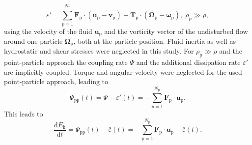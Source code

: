 \documentclass[11pt,a4paper,openany,oneside,parskip=half*]{article}
\renewcommand*\vec[1]{\boldsymbol{#1}}
\begin{document}
\begin{equation}
	\varepsilon' = \sum_{p=1}^{N_\mathrm{p}} \vec{F}_\mathrm{p} \cdot (\vec{u}_\mathrm{p}-\vec{v}_\mathrm{p})+ \vec{T}_\mathrm{p} \cdot (\vec{\Omega}_\mathrm{p} - \vec{\omega}_\mathrm{p}), \; \rho_\mathrm{p} \gg \rho,
\end{equation}
using the velocity of the fluid $\vec{u}_\mathrm{p}$ and the vorticity vector of the undisturbed flow around one particle $\vec{\Omega}_\mathrm{p}$, both at the particle position. Fluid inertia as well as hydrostatic and shear stresses were neglected in this study.
\newline
For $\rho_\mathrm{p} \gg \rho$ and the point-particle approach the coupling rate $\Psi$ and the additional dissipation rate $\varepsilon'$ are implicitly coupled. Torque and angular velocity were neglected for the used point-particle approach, leading to
\begin{equation}
\Psi_\mathrm{pp} (t) = \Psi - \varepsilon'(t) = - \sum_{p=1}^{N_\mathrm{p}} \vec{F}_\mathrm{p} \cdot \vec{u}_\mathrm{p}.
\end{equation}
This leads to 
\begin{equation}
\frac{\mathrm{d} E_\mathrm{k}}{\mathrm{d} t} = \Psi_\mathrm{pp} (t) - \bar{\varepsilon} (t) = - \sum_{p=1}^{N_\mathrm{p}} \vec{F}_\mathrm{p} \cdot \vec{u}_\mathrm{p} - \bar{\varepsilon} (t).
\end{equation}
\newline
\end{document}
